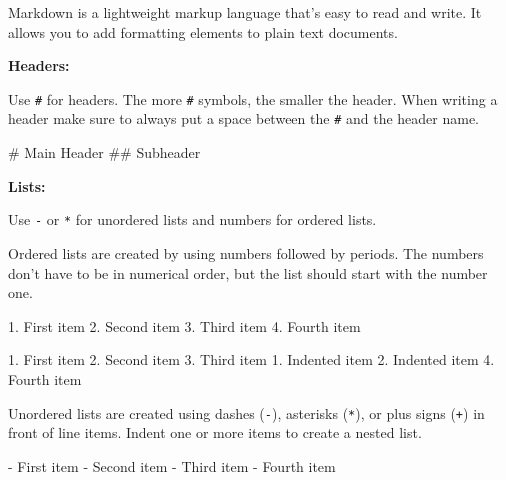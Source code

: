 \documentclass[
  letterpaper,
  DIV=11,
  numbers=noendperiod]{scrreprt}
\newenvironment{Shaded}{}{}
\newcommand{\FunctionTok}[1]{\textcolor[rgb]{0.44,0.26,0.76}{#1}}
\newcommand{\NormalTok}[1]{\textcolor[rgb]{0.14,0.16,0.18}{#1}}
\newcommand{\SpecialStringTok}[1]{\textcolor[rgb]{0.01,0.18,0.38}{#1}}
\begin{document}
Markdown is a lightweight markup language that's easy to read and write.
It allows you to add formatting elements to plain text documents.

\textbf{Headers:}

Use \texttt{\#} for headers. The more \texttt{\#} symbols, the smaller
the header. When writing a header make sure to always put a space
between the \texttt{\#} and the header name.

\begin{Shaded}
\begin{Highlighting}[]
\FunctionTok{\# Main Header}
\FunctionTok{\#\# Subheader}
\end{Highlighting}
\end{Shaded}

\textbf{Lists:}

Use \texttt{-} or \texttt{*} for unordered lists and numbers for ordered
lists.

Ordered lists are created by using numbers followed by periods. The
numbers don't have to be in numerical order, but the list should start
with the number one.

\begin{Shaded}
\begin{Highlighting}[]
\SpecialStringTok{1. }\NormalTok{First item}
\SpecialStringTok{2. }\NormalTok{Second item}
\SpecialStringTok{3. }\NormalTok{Third item}
\SpecialStringTok{4. }\NormalTok{Fourth item }
\end{Highlighting}
\end{Shaded}

\begin{Shaded}
\begin{Highlighting}[]
\SpecialStringTok{1. }\NormalTok{First item}
\SpecialStringTok{2. }\NormalTok{Second item}
\SpecialStringTok{3. }\NormalTok{Third item}
\SpecialStringTok{    1. }\NormalTok{Indented item}
\SpecialStringTok{    2. }\NormalTok{Indented item}
\SpecialStringTok{4. }\NormalTok{Fourth item }
\end{Highlighting}
\end{Shaded}

Unordered lists are created using dashes (\texttt{-}), asterisks
(\texttt{*}), or plus signs (\texttt{+}) in front of line items. Indent
one or more items to create a nested list.

\begin{Shaded}
\begin{Highlighting}[]
\SpecialStringTok{{-} }\NormalTok{First item}
\SpecialStringTok{{-} }\NormalTok{Second item}
\SpecialStringTok{{-} }\NormalTok{Third item}
\SpecialStringTok{{-} }\NormalTok{Fourth item }
\end{Highlighting}
\end{Shaded}
\end{document}
